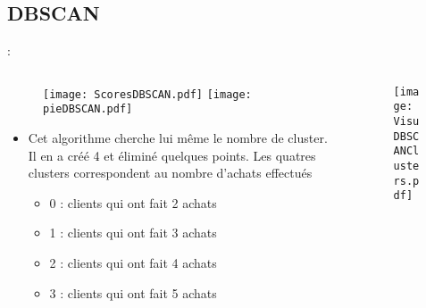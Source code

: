 \documentclass[8pt,aspectratio=169,hyperref={unicode=true}]{beamer}
\begin{document}
\subsection{DBSCAN}
\begin{frame}{\insertsection: \insertsubsection}
    \begin{columns}
        \begin{column}{.55\textwidth}
            \begin{figure}
                \texttt{[image: ScoresDBSCAN.pdf]}
                \texttt{[image: pieDBSCAN.pdf]}
            \end{figure}
            \begin{itemize}
                \item Cet algorithme cherche lui même le nombre de cluster. Il en a créé 4 et éliminé quelques points. Les quatres clusters correspondent au nombre d'achats effectués
                \begin{itemize}
                    \item 0 : clients qui ont fait 2 achats
                    \item 1 : clients qui ont fait 3 achats
                    \item 2 : clients qui ont fait 4 achats
                    \item 3 : clients qui ont fait 5 achats
                \end{itemize}
            \end{itemize}
        \end{column}
        \begin{column}{.45\textwidth}
            \begin{figure}
                \texttt{[image: VisuDBSCANClusters.pdf]}
            \end{figure}
        \end{column}
    \end{columns}
\end{frame}
\end{document}
